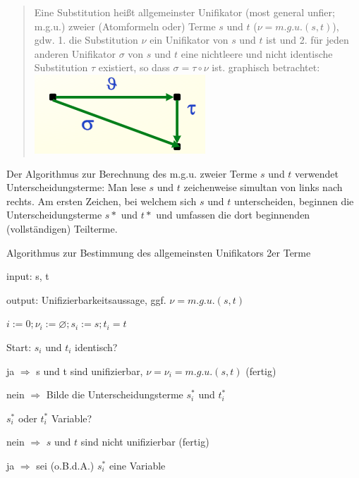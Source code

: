 \documentclass[a4paper]{article}
\begin{document}
\begin{multicols}{3}
\begin{quote}
    Eine Substitution heißt allgemeinster Unifikator (most general unfier;
    m.g.u.) zweier (Atomformeln oder) Terme $s$ und $t$
    ($\nu= m.g.u.(s,t)$), gdw. 1. die Substitution $\nu$ ein Unifikator von
    $s$ und $t$ ist und 2. für jeden anderen Unifikator $\sigma$ von $s$ und
    $t$ eine nichtleere und nicht identische Substitution $\tau$ existiert,
    so dass $\sigma=\tau\circ\nu$ ist. graphisch betrachtet:
    \includegraphics[width=\linewidth]{Assets/Logik_allgemeinster-unifikator.png}
  \end{quote}

  Der Algorithmus zur Berechnung des m.g.u. zweier Terme $s$ und $t$
  verwendet Unterscheidungsterme: Man lese $s$ und $t$ zeichenweise
  simultan von links nach rechts. Am ersten Zeichen, bei welchem sich $s$
  und $t$ unterscheiden, beginnen die Unterscheidungsterme $s*$ und $t*$
  und umfassen die dort beginnenden (vollständigen) Teilterme.

  Algorithmus zur Bestimmung des allgemeinsten Unifikators 2er Terme

  \begin{itemize*}
    \itemsep1pt\parskip0pt
    \item
          input: s, t
    \item
          output: Unifizierbarkeitsaussage, ggf. $\nu= m.g.u.( s , t )$
    \item
          $i:=0;\nu_i:=\varnothing;s_i:=s; t_i=t$
    \item
          Start: $s_i$ und $t_i$ identisch?
    \item
          ja $\Rightarrow$ s und t sind unifizierbar, $\nu=\nu_i=m.g.u.(s,t)$
          (fertig)
    \item
          nein $\Rightarrow$ Bilde die Unterscheidungsterme $s_i^*$ und $t_i^*$

          \begin{itemize*}
            \item
                  $s_i^*$ oder $t_i^*$ Variable?
            \item
                  nein $\Rightarrow$ $s$ und $t$ sind nicht unifizierbar (fertig)
            \item
                  ja $\Rightarrow$ sei (o.B.d.A.) $s_i^*$ eine Variable


\end{itemize*}
\end{itemize*}
\end{multicols}
\end{document}
